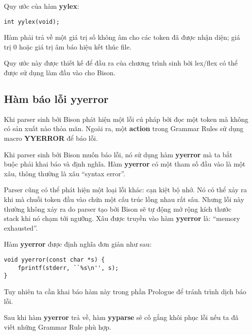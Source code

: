 \documentclass[../report.tex]{subfiles}
\begin{document}
Quy ước của hàm \textbf{yylex}:
\begin{lstlisting}
int yylex(void);
\end{lstlisting}
Hàm phải trả về một giá trị số không âm cho các token 
đã được nhận diện; giá trị 0 hoặc giá trị âm báo hiệu kết thúc file. 

Quy ước này được thiết kế để đầu ra của chương trình 
sinh bởi lex/flex có thể được sử dụng làm đầu vào cho Bison. 

\subsection{Hàm báo lỗi yyerror}
Khi parser sinh bởi Bison phát hiện một lỗi cú pháp bởi đọc một token 
mà không có sản xuất nào thỏa mãn. Ngoài ra, một \textbf{action}
trong Grammar Rules sử dụng macro \textbf{YYERROR} để báo lỗi. 

Khi parser sinh bởi Bison muốn báo lỗi, nó sử dụng hàm 
\textbf{yyerror} mà ta bắt buộc phải khai báo và định nghĩa. 
Hàm \textbf{yyerror} có một tham số đầu vào là một xâu, thông 
thường là xâu ``syntax error''.

Parser cũng có thể phát hiện một loại lỗi khác: cạn kiệt bộ nhớ. 
Nó có thể xảy ra khi mà chuỗi token đầu vào chứa một cấu trúc 
lồng nhau rất sâu. Nhưng lỗi này thường không xảy ra do 
parser tạo bởi Bison sẽ tự động mở rộng kích thước stack khi 
nó chạm tới ngưỡng. Xâu được truyền vào hàm \textbf{yyerror}
là: ``memory exhausted''. 

Hàm \textbf{yyerror} được định nghĩa đơn giản như sau: 
\begin{lstlisting}
void yyerror(const char *s) {
    fprintf(stderr, ``%s\n'', s);
}
\end{lstlisting}
Tuy nhiên ta cần khai báo hàm này trong phần Prologue để tránh 
trình dịch báo lỗi. 

Sau khi hàm \textbf{yyerror} trả về, hàm \textbf{yyparse} 
sẽ cố gắng khôi phục lỗi nếu ta đã viết những Grammar Rule phù 
hợp.
\end{document}
